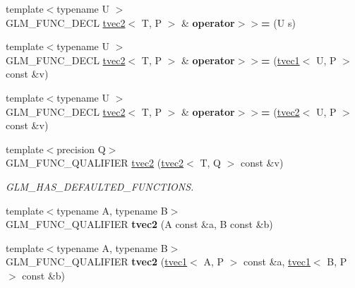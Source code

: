 \begin{DoxyCompactItemize}
\item 
\hypertarget{structglm_1_1tvec2_ad8ca4987bb90df1b6d601b3e460c3d1b}{{\footnotesize template$<$typename U $>$ }\\G\-L\-M\-\_\-\-F\-U\-N\-C\-\_\-\-D\-E\-C\-L \hyperlink{structglm_1_1tvec2}{tvec2}$<$ T, P $>$ \& {\bfseries operator$>$$>$=} (U s)}\label{structglm_1_1tvec2_ad8ca4987bb90df1b6d601b3e460c3d1b}

\item 
\hypertarget{structglm_1_1tvec2_a44b9f53542701ce37c0806bc29a7c89c}{{\footnotesize template$<$typename U $>$ }\\G\-L\-M\-\_\-\-F\-U\-N\-C\-\_\-\-D\-E\-C\-L \hyperlink{structglm_1_1tvec2}{tvec2}$<$ T, P $>$ \& {\bfseries operator$>$$>$=} (\hyperlink{structglm_1_1tvec1}{tvec1}$<$ U, P $>$ const \&v)}\label{structglm_1_1tvec2_a44b9f53542701ce37c0806bc29a7c89c}

\item 
\hypertarget{structglm_1_1tvec2_aea51b73efe332b3fae252644ea44dc43}{{\footnotesize template$<$typename U $>$ }\\G\-L\-M\-\_\-\-F\-U\-N\-C\-\_\-\-D\-E\-C\-L \hyperlink{structglm_1_1tvec2}{tvec2}$<$ T, P $>$ \& {\bfseries operator$>$$>$=} (\hyperlink{structglm_1_1tvec2}{tvec2}$<$ U, P $>$ const \&v)}\label{structglm_1_1tvec2_aea51b73efe332b3fae252644ea44dc43}

\item 
\hypertarget{structglm_1_1tvec2_adae9abcd4cbbe61d0c88b6a7b3a0f7ab}{{\footnotesize template$<$precision Q$>$ }\\G\-L\-M\-\_\-\-F\-U\-N\-C\-\_\-\-Q\-U\-A\-L\-I\-F\-I\-E\-R \hyperlink{structglm_1_1tvec2_adae9abcd4cbbe61d0c88b6a7b3a0f7ab}{tvec2} (\hyperlink{structglm_1_1tvec2}{tvec2}$<$ T, Q $>$ const \&v)}\label{structglm_1_1tvec2_adae9abcd4cbbe61d0c88b6a7b3a0f7ab}

\begin{DoxyCompactList}\small\item\em G\-L\-M\-\_\-\-H\-A\-S\-\_\-\-D\-E\-F\-A\-U\-L\-T\-E\-D\-\_\-\-F\-U\-N\-C\-T\-I\-O\-N\-S. \end{DoxyCompactList}\item 
\hypertarget{structglm_1_1tvec2_a995abc8f60875a7a9dc156c78cd558e4}{{\footnotesize template$<$typename A, typename B$>$ }\\G\-L\-M\-\_\-\-F\-U\-N\-C\-\_\-\-Q\-U\-A\-L\-I\-F\-I\-E\-R {\bfseries tvec2} (A const \&a, B const \&b)}\label{structglm_1_1tvec2_a995abc8f60875a7a9dc156c78cd558e4}

\item 
\hypertarget{structglm_1_1tvec2_a3847fd3a8591d6947e7e24398284f09e}{{\footnotesize template$<$typename A, typename B$>$ }\\G\-L\-M\-\_\-\-F\-U\-N\-C\-\_\-\-Q\-U\-A\-L\-I\-F\-I\-E\-R {\bfseries tvec2} (\hyperlink{structglm_1_1tvec1}{tvec1}$<$ A, P $>$ const \&a, \hyperlink{structglm_1_1tvec1}{tvec1}$<$ B, P $>$ const \&b)}\label{structglm_1_1tvec2_a3847fd3a8591d6947e7e24398284f09e}


\end{DoxyCompactItemize}
